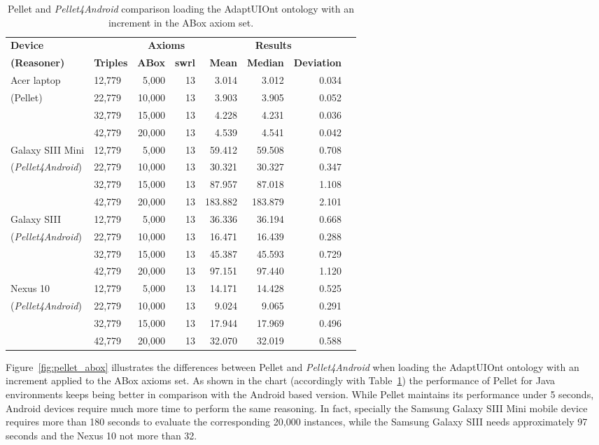 \begin{table}
 \caption{Pellet and \textit{Pellet4Android} comparison loading the AdaptUIOnt 
ontology with an increment in the ABox axiom set.}
 \label{tbl:eval_abox}
 \footnotesize
 \centering
  \begin{tabular}{l l r r r r r r}
  \hline 
  \textbf{Device} &  & \multicolumn{2}{c}{\textbf{Axioms}} & 
  \multicolumn{3}{c}{\textbf{Results}}	\\
  \textbf{(Reasoner)} & \textbf{Triples}& \textbf{ABox} & \textbf{\ac{swrl}}
  & \textbf{Mean} & \textbf{Median} & \textbf{Deviation}	\\
  \hline 
  Acer laptop & 12,779 & 5,000  & 13 & 3.014 & 3.012 & 0.034	\\  
  (Pellet)    & 22,779 & 10,000 & 13 & 3.903 & 3.905 & 0.052	\\
	      & 32,779 & 15,000	& 13 & 4.228 & 4.231 & 0.036	\\
	      & 42,779 & 20,000 & 13 & 4.539 & 4.541 & 0.042	\\
  \hline	      
  Galaxy SIII Mini& 12,779& 5,000& 13& 59.412& 59.508& 0.708	\\
  (\textit{Pellet4Android}) & 22,779 & 10,000 & 13 & 30.321 & 30.327 & 0.347 \\
	      & 32,779 & 15,000	& 13 & 87.957 & 87.018 & 1.108 	\\
	      & 42,779 & 20,000	& 13 & 183.882&183.879 & 2.101	\\
  \hline	      
  Galaxy SIII & 12,779 & 5,000	& 13 & 36.336 & 36.194 & 0.668	\\
(\textit{Pellet4Android})& 22,779 & 10,000 & 13	& 16.471 & 16.439 & 0.288\\
		& 32,779 & 15,000 & 13 & 45.387	& 45.593 & 0.729\\
		& 42,779 & 20,000 & 13 & 97.151	& 97.440 & 1.120\\
  \hline		
  Nexus 10	& 12,779 & 5,000  & 13 & 14.171 & 14.428 & 0.525\\
(\textit{Pellet4Android})& 22,779 & 10,000 & 13 & 9.024 & 9.065 & 0.291\\
		& 32,779 & 15,000 & 13 & 17.944& 17.969  & 0.496\\
		& 42,779 & 20,000 & 13 & 32.070	& 32.019 & 0.588\\
  \hline
\end{tabular}
\end{table}

Figure~\ref{fig:pellet_abox} illustrates the differences between Pellet and
\textit{Pellet4Android} when loading the AdaptUIOnt ontology with an increment 
applied to the ABox axioms set. As shown in the chart (accordingly with
Table~\ref{tbl:eval_abox}) the performance of Pellet for Java environments 
keeps being better in comparison with the Android based version. While Pellet
maintains its performance under 5 seconds, Android devices require much more
time to perform the same reasoning. In fact, specially the Samsung Galaxy SIII 
Mini mobile device requires more than 180 seconds to evaluate the corresponding
20,000 instances, while the Samsung Galaxy SIII needs approximately 97 seconds 
and the Nexus 10 not more than 32.

